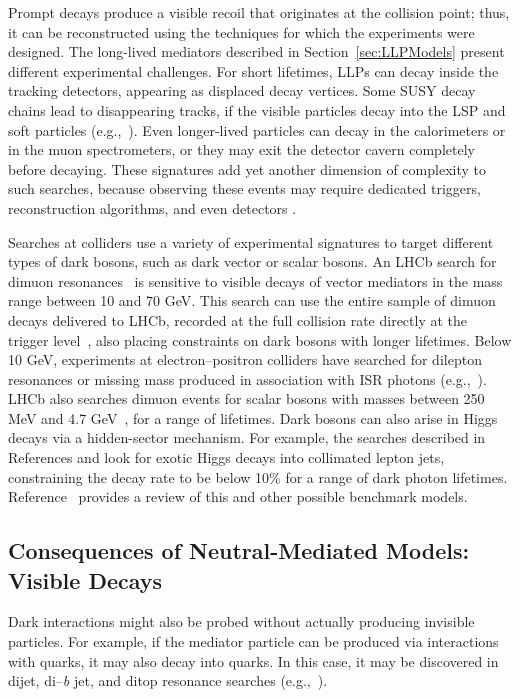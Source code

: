 \documentclass{ar-1col}
\newcommand{\IP}{invisible particle}
\begin{document}
{Prompt decays produce a visible recoil that originates at the collision
point; thus, it can be reconstructed using the techniques for
which the experiments were designed. The long-lived mediators
described in Section~\ref{sec:LLPModels} present different
experimental challenges. For short lifetimes, LLPs can decay inside the tracking detectors, appearing as
displaced decay vertices. Some SUSY decay chains lead to
disappearing tracks, if the visible particles decay into the LSP
and soft particles (e.g.,~).
Even longer-lived particles can decay in the calorimeters or in
the muon spectrometers, or they may exit the detector cavern
completely before decaying. 
These signatures add yet another
dimension of complexity to such searches, because observing these
events may require dedicated triggers, reconstruction algorithms,
and even detectors \cite{Ball:2016zrp,Chou:2016lxi}.

Searches at colliders use a variety of experimental signatures to
target different types of dark bosons, such as dark vector or
scalar bosons. An LHCb search for dimuon
resonances~\cite{Aaij:2017rft} is sensitive to visible decays of
vector mediators in the mass range between 10 and 70 GeV. This
search can use the entire sample of dimuon decays delivered to
LHCb, recorded at the full collision rate directly at the trigger
level~\cite{Aaij:2016rxn}, also placing constraints on dark bosons with longer lifetimes. 
Below 10 GeV, experiments at
electron--positron colliders have searched for dilepton resonances
or missing mass produced in association with ISR photons (e.g.,~). 
LHCb also searches dimuon
events for scalar bosons with masses between 250 MeV and 4.7
GeV~\cite{Aaij:2016qsm}, for a range of lifetimes. Dark bosons can
also arise in Higgs decays via a hidden-sector mechanism. For
example, the searches described in References  and 
look for exotic Higgs decays into collimated lepton jets,
constraining the decay rate to be below 10\% for a range of dark
photon lifetimes. Reference~ provides a review of this and other
possible benchmark models.

\subsection{Consequences of Neutral-Mediated Models: Visible Decays}\label{sec:MediatorSearches} \label{sub:twoBody}

Dark interactions might also be probed without actually producing
{\IP}s. For example, if the mediator particle can be produced via
interactions with quarks, it may also decay into quarks. In this
case, it may be discovered in dijet, di--\textit{b} jet, and ditop resonance searches
(e.g.,~).

}
\end{document}
